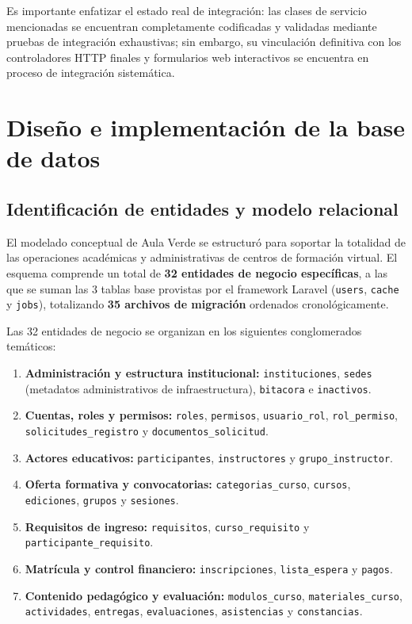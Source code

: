 Es importante enfatizar el estado real de integración: las clases de servicio mencionadas se encuentran completamente codificadas y validadas mediante pruebas de integración exhaustivas; sin embargo, su vinculación definitiva con los controladores HTTP finales y formularios web interactivos se encuentra en proceso de integración sistemática.

\section{Diseño e implementación de la base de datos}
\label{sec:base_datos}

\subsection{Identificación de entidades y modelo relacional}
\label{sec:entidades_modelo}

El modelado conceptual de Aula Verde se estructuró para soportar la totalidad de las operaciones académicas y administrativas de centros de formación virtual. El esquema comprende un total de \textbf{32 entidades de negocio específicas}, a las que se suman las 3 tablas base provistas por el framework Laravel (\texttt{users}, \texttt{cache} y \texttt{jobs}), totalizando \textbf{35 archivos de migración} ordenados cronológicamente.

Las 32 entidades de negocio se organizan en los siguientes conglomerados temáticos:
\begin{enumerate}
    \item \textbf{Administración y estructura institucional:} \texttt{instituciones}, \texttt{sedes} (metadatos administrativos de infraestructura), \texttt{bitacora} e \texttt{inactivos}.
    \item \textbf{Cuentas, roles y permisos:} \texttt{roles}, \texttt{permisos}, \texttt{usuario\_rol}, \texttt{rol\_permiso}, \texttt{solicitudes\_registro} y \texttt{documentos\_solicitud}.
    \item \textbf{Actores educativos:} \texttt{participantes}, \texttt{instructores} y \texttt{grupo\_instructor}.
    \item \textbf{Oferta formativa y convocatorias:} \texttt{categorias\_curso}, \texttt{cursos}, \texttt{ediciones}, \texttt{grupos} y \texttt{sesiones}.
    \item \textbf{Requisitos de ingreso:} \texttt{requisitos}, \texttt{curso\_requisito} y \texttt{participante\_requisito}.
    \item \textbf{Matrícula y control financiero:} \texttt{inscripciones}, \texttt{lista\_espera} y \texttt{pagos}.
    \item \textbf{Contenido pedagógico y evaluación:} \texttt{modulos\_curso}, \texttt{materiales\_curso}, \texttt{actividades}, \texttt{entregas}, \texttt{evaluaciones}, \texttt{asistencias} y \texttt{constancias}.
\end{enumerate}

